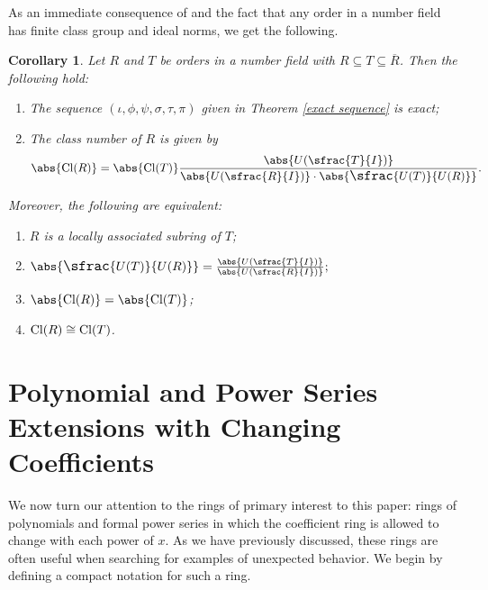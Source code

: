 \documentclass[12pt]{amsart}
\newtheorem{corollary}[theorem]{Corollary}
\theoremstyle{definition}
\newcommand{\Rbar}{{\overline{R}}}
\newcommand{\Cl}{\textup{Cl}}
\newcommand{\quot}[2]{\large\sfrac{#1}{#2}\normalsize}
\begin{document}
As an immediate consequence of \cite[Theorem 5.3]{conrad} and the fact that any order in a number field has finite class group and ideal norms, we get the following.

\begin{corollary}
    Let $R$ and $T$ be orders in a number field with $R\subseteq T\subseteq \Rbar$. Then the following hold:
    \begin{enumerate}
        \item The sequence $(\iota,\phi,\psi,\sigma,\tau,\pi)$ given in Theorem \ref{exact sequence} is exact;
        \item The class number of $R$ is given by
        $$\abs{\Cl(R)}=\abs{\Cl(T)}\frac{\abs{U(\sfrac{T}{I})}}{\abs{U(\sfrac{R}{I})}\cdot\abs{\quot{U(T)}{U(R)}}}.$$
    \end{enumerate}
    Moreover, the following are equivalent:
    \begin{enumerate}
        \item $R$ is a locally associated subring of $T$;
        \item $\abs{\quot{U(T)}{U(R)}}=\frac{\abs{U(\sfrac{T}{I})}}{\abs{U(\sfrac{R}{I})}};$
        \item $\abs{\Cl(R)}=\abs{\Cl(T)}$;
        \item $\Cl(R)\cong \Cl(T)$.
    \end{enumerate}
\end{corollary}

\section{Polynomial and Power Series Extensions with Changing Coefficients}

We now turn our attention to the rings of primary interest to this paper: rings of polynomials and formal power series in which the coefficient ring is allowed to change with each power of $x$. As we have previously discussed, these rings are often useful when searching for examples of unexpected behavior. We begin by defining a compact notation for such a ring.
\end{document}
